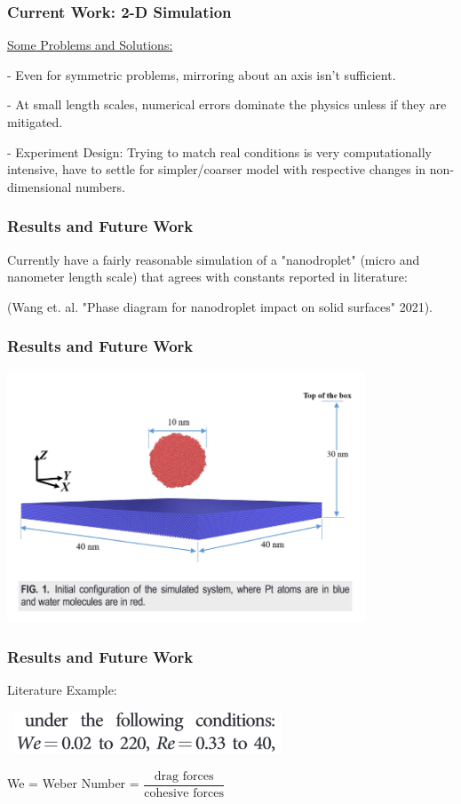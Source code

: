 \documentclass[12pt]{beamer}
\begin{document}
\begin{frame}
    \frametitle{Current Work: 2-D Simulation}
    \underline{Some Problems and Solutions:}

    - Even for symmetric problems, mirroring about an axis isn't sufficient.

    - At small length scales, numerical errors dominate the physics unless if 
    they are mitigated.
    
    - Experiment Design: Trying to match real conditions is very 
    computationally intensive, have to settle for simpler/coarser model with 
    respective changes in non-dimensional numbers.
\end{frame}

\begin{frame}
    \frametitle{Results and Future Work}
    Currently have a fairly reasonable simulation of a "nanodroplet" (micro and
    nanometer length scale) that agrees with constants reported in literature:
    
    (Wang et. al. "Phase diagram for nanodroplet impact on solid surfaces" 2021).
\end{frame}
\begin{frame}
    \frametitle{Results and Future Work}
    \includegraphics[width=0.8\textwidth]{img/wang-3d.png}
\end{frame}
\begin{frame}
    \frametitle{Results and Future Work}
    Literature Example:

    \
    \includegraphics[width=0.6\textwidth]{img/wang-constants.png}

    We = Weber Number = $\dfrac{\text{drag forces}}{\text{cohesive forces}}$
\end{frame}
\end{document}
